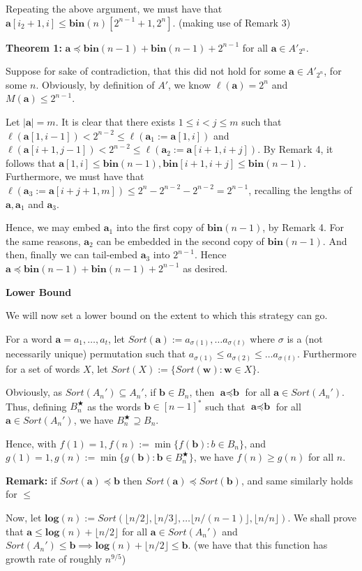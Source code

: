\documentclass{article}
\begin{document}
Repeating the above argument, we must have that $\textbf{a}[i_2+1,i] \le \textbf{bin}(n)[2^{n-1}+1,2^n]$. (making use of Remark 3)

\textbf{Theorem 1:} $\textbf{a} \preceq \textbf{bin}(n-1)+\textbf{bin}(n-1)+2^{n-1}$ for all $\textbf{a} \in A'_{2^n}$.

Suppose for sake of contradiction, that this did not hold for some $\textbf{a} \in A'_{2^n}$, for some $n$. Obviously, by definition of $A'$, we know $\ell(\textbf{a}) = 2^n$ and $M(\textbf{a}) \le 2^{n-1}$. 

Let $|\textbf{a}| = m$. It is clear that there exists $1\le i<j \le m$ such that $\ell(\textbf{a}[1,i-1])<2^{n-2}\le \ell(\textbf{a}_1:=\textbf{a}[1,i])$ and $\ell(\textbf{a}[i+1,j-1])<2^{n-2}\le \ell(\textbf{a}_2:=\textbf{a}[i+1,i+j])$. By Remark 4, it follows that $\textbf{a}[1,i] \le \textbf{bin}(n-1),\textbf{bin}[i+1,i+j] \le \textbf{bin}(n-1)$. Furthermore, we must have that $\ell(\textbf{a}_3:=\textbf{a}[i+j+1,m]) \le 2^n-2^{n-2}-2^{n-2} = 2^{n-1}$, recalling the lengths of $\textbf{a},\textbf{a}_1$ and $\textbf{a}_3$. 

Hence, we may embed $\textbf{a}_1$ into the first copy of $\textbf{bin}(n-1)$, by Remark 4. For the same reasons, $\textbf{a}_2$ can be embedded in the second copy of $\textbf{bin}(n-1)$. And then, finally we can tail-embed $\textbf{a}_3$ into $2^{n-1}$. Hence $\textbf{a} \preceq \textbf{bin}(n-1)+\textbf{bin}(n-1)+2^{n-1}$ as desired.


\textbf{Lower Bound}

We will now set a lower bound on the extent to which this strategy can go. 

For a word $\textbf{a} = a_1, \dots, a_t$, let $Sort(\textbf{a}) := a_{\sigma(1)}, \dots a_{\sigma(t)}$ where $\sigma$ is a (not necessarily unique) permutation such that $a_{\sigma(1)}\le a_{\sigma(2)} \le  \dots a_{\sigma(t)}$. Furthermore for a set of words $X$, let $Sort(X):= \{ Sort(\textbf{w}): \textbf{w} \in X\}$.

Obviously, as $Sort(A_n') \subseteq A_n'$, if $\textbf{b} \in B_n$, then $\textbf{a} \preceq \textbf{b}$ for all $\textbf{a} \in Sort(A_n')$. Thus, defining $B_n^\bigstar $ as the words $\textbf{b} \in [n-1]^*$ such that $\textbf{a} \preceq \textbf{b}$ for all $\textbf{a} \in Sort(A_n')$, we have $B_n^\bigstar \supseteq B_n$.

Hence, with $f(1) = 1, f(n):= \min\{f(\textbf{b}): b \in B_n\}$, and $g(1) = 1, g(n) := \min\{g(\textbf{b}): \textbf{b} \in B_n^\bigstar\}$, we have $f(n) \geq g(n)$ for all $n$.



\textbf{Remark:} if $Sort(\textbf{a}) \preceq \textbf{b}$ then $Sort(\textbf{a}) \preceq Sort(\textbf{b})$, and same similarly holds for $\le$


Now, let $\textbf{log}(n):= Sort( \lfloor n/2 \rfloor,\lfloor n/3 \rfloor, \dots  \lfloor n/(n-1) \rfloor, \lfloor n/n \rfloor)$. We shall prove that $\textbf{a} \le \textbf{log}(n)+ \lfloor n/2 \rfloor $ for all $\textbf{a} \in Sort(A_n')$ and $Sort(A_n') \le \textbf{b} \implies \textbf{log}(n)+ \lfloor n/2 \rfloor  \le \textbf{b}$. (we have that this function has growth rate of roughly $n^{9/5}$)
\end{document}
